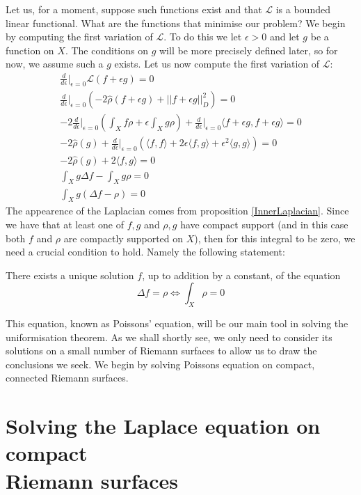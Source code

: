 \documentclass[a4paper,12pt]{report}
\theoremstyle{plain}
\theoremstyle{definition}
\begin{document}
Let us, for a moment, suppose such functions exist and that $\mathcal{L}$ is a bounded linear functional. What are the functions that minimise our problem?
We begin by computing the first variation of $\mathcal{L}$. To do this we let $\epsilon > 0$ and let $g$ be a function on $X$. The conditions on $g$ will be more precisely defined later, so for now, we assume such a $g$ exists. Let us now compute the first variation of $\mathcal{L}$:
\begin{gather*}
  \frac{d}{d\epsilon}\biggr\rvert_{\epsilon = 0}\mathcal{L}(f+\epsilon g) = 0 \\
  \frac{d}{d\epsilon}\biggr\rvert_{\epsilon = 0}(-2\hat{\rho}(f+\epsilon g) + ||f+\epsilon g||_D^2) = 0 \\
  -2\frac{d}{d\epsilon}\biggr\rvert_{\epsilon = 0}(\int_X f\rho  + \epsilon \int_X g\rho) + \frac{d}{d\epsilon}\biggr\rvert_{\epsilon = 0} \langle f + \epsilon g, f + \epsilon g \rangle = 0 \\
  -2\hat{\rho}(g)+\frac{d}{d\epsilon}\biggr\rvert_{\epsilon = 0}(\langle f, f \rangle + 2\epsilon \langle f, g \rangle +\epsilon^2 \langle g, g \rangle) = 0 \\
  -2\hat{\rho}(g) + 2\langle f, g \rangle = 0 \\
  \int_X g\Delta f - \int_X g\rho = 0 \\
  \int_X g(\Delta f - \rho) = 0 
\end{gather*}
The appearence of the Laplacian comes from proposition \ref*{InnerLaplacian}.
Since we have that at least one of $f,g$ and $\rho,g$ have compact support (and in this case both $f$ and $\rho$ are compactly supported on $X$), then for this integral to be zero, we need a crucial condition to hold. Namely the following statement:

There exists a unique solution $f$, up to addition by a constant, of the equation 
\[ \Delta f = \rho \Longleftrightarrow \int_X \rho = 0\]

This equation, known as Poissons' equation, will be our main tool in solving the uniformisation theorem. As we shall shortly see, we only need to consider its solutions on a small number of Riemann surfaces to allow us to draw the conclusions we seek. We begin by solving Poissons equation on compact, connected Riemann surfaces.

\section{Solving the Laplace equation on compact \\Riemann surfaces}
\end{document}
